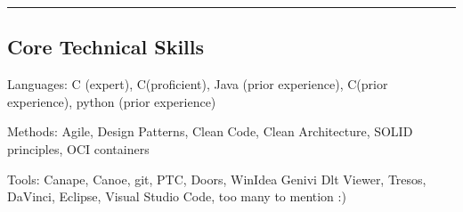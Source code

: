 \documentclass[10pt,letterpaper]{article}
\newenvironment{indentsection}[1]%
{\begin{list}{}%
	{\setlength{\leftmargin}{#1}}%
	\item[]%
}
{\end{list}}
\newcommand{\CPP}
{C\nolinebreak[4]\hspace{-.05em}\raisebox{.22ex}{\footnotesize\bf ++}}
\newcommand{\Csharp}
{C\nolinebreak[4]\hspace{-.05em}\raisebox{.22ex}{\footnotesize\bf \#}}
\begin{document}
\hrule
\vspace{-0.4em}
\subsection*{Core Technical Skills}

\begin{indentsection}{\parindent}
\begin{description*}
	\item[Languages:]
	C (expert), \CPP (proficient), Java (prior experience), \Csharp (prior experience), python (prior experience)
	\item[Methods:]
	Agile, Design Patterns, Clean Code, Clean Architecture, SOLID principles, OCI containers
	\item[Tools:]
	Canape, Canoe, git, PTC, Doors, WinIdea Genivi Dlt Viewer, Tresos, DaVinci, Eclipse, Visual Studio Code, too many to mention :) 
\end{description*}
\end{indentsection}
\end{document}

